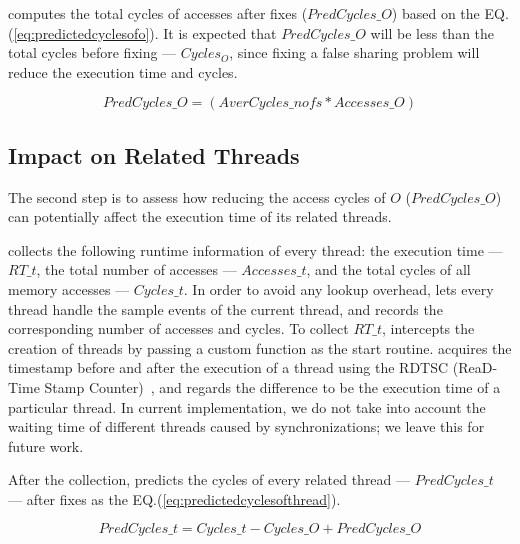 \cheetah{} computes the total cycles of accesses after fixes ($PredCycles\_{O}$) based on the EQ.(\ref{eq:predictedcyclesofo}).  It is expected that $PredCycles\_{O}$ will be less than the total cycles before fixing --- $Cycles_O$, since fixing a false sharing problem will reduce the execution time and cycles.  

\begin{equation}
\label{eq:predictedcyclesofo}
PredCycles\_{O} = (AverCycles\_{nofs} * Accesses\_O)
\end{equation} 

\subsection{Impact on Related Threads}
\label{sec:impactthread}

The second step is to assess how reducing the access cycles of $O$ ($PredCycles\_{O}$) can potentially affect the execution time of its related threads. 

\Cheetah{} collects the following runtime information of every thread: the execution time --- $RT\_{t}$, the total number of accesses --- $Accesses\_{t}$, and the total cycles of all memory accesses --- $Cycles\_{t}$. In order to avoid any lookup overhead, \cheetah{} lets every thread handle the sample events of the current thread, and records the corresponding number of accesses and cycles. To collect $RT\_{t}$, \cheetah{} intercepts the creation of threads by passing a custom function as the start routine. \cheetah{} acquires the timestamp before and after the execution of a thread using the RDTSC (ReaD-Time Stamp Counter)~\cite{rtdsc}, and regards the difference to be the execution time of a particular thread. In current implementation, we do not take into account the waiting time of different threads caused by synchronizations; we leave this for future work. 

After the collection, \cheetah{} predicts the cycles of every related thread --- $PredCycles\_{t}$ --- after fixes as the EQ.(\ref{eq:predictedcyclesofthread}). 

\begin{equation}
\label{eq:predictedcyclesofthread}
 PredCycles\_{t} = Cycles\_{t} - Cycles\_{O} + PredCycles\_{O} 
\end{equation} 
 
